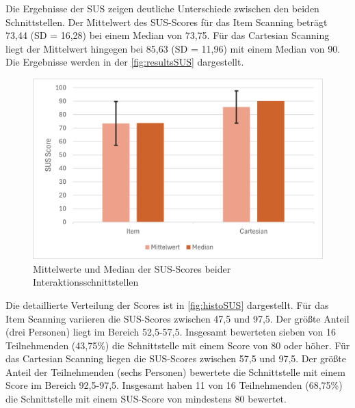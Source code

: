 Die Ergebnisse der SUS zeigen deutliche Unterschiede zwischen den beiden Schnittstellen. Der Mittelwert des SUS-Scores für das Item Scanning beträgt 73,44 (SD = 16,28) bei einem Median von 73,75. Für das Cartesian Scanning liegt der Mittelwert hingegen bei 85,63 (SD = 11,96) mit einem Median von 90. Die Ergebnisse werden in der \autoref{fig:resultsSUS} dargestellt. 

\begin{figure}[tbh]
    \centering
    \includegraphics[scale=0.75]{images/Results/SUS-Scores.png}
    \caption{Mittelwerte und Median der SUS-Scores beider Interaktionsschnittstellen}
    \label{fig:resultsSUS}
\end{figure}

Die detaillierte Verteilung der Scores ist in \autoref{fig:histoSUS} dargestellt. Für das Item Scanning variieren die SUS-Scores zwischen 47,5 und 97,5. Der größte Anteil (drei Personen) liegt im Bereich 52,5-57,5. Insgesamt bewerteten sieben von 16 Teilnehmenden (43,75\%) die Schnittstelle mit einem Score von 80 oder höher. Für das Cartesian Scanning liegen die SUS-Scores zwischen 57,5 und 97,5. Der größte Anteil der Teilnehmenden (sechs Personen) bewertete die Schnittstelle mit einem Score im Bereich 92,5-97,5. Insgesamt haben 11 von 16 Teilnehmenden (68,75\%) die Schnittstelle mit einem SUS-Score von mindestens 80 bewertet. 

